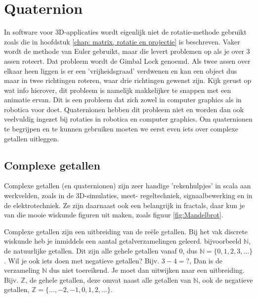 \chapter{Quaternion}
\label{chap: Quaternion}
In software voor 3D-applicaties wordt eigenlijk niet de rotatie-methode gebruikt zoals die in hoofdstuk \ref{chap: matrix, rotatie en projectie} is beschreven. Vaker wordt de methode van Euler gebruikt, maar die levert problemen op als je over 3 assen roteert. Dat probleem wordt de Gimbal Lock genoemd. Als twee assen over elkaar heen liggen is er een 'vrijheidsgraad' verdwenen en kan een object dus maar in twee richtingen roteren, waar drie richtingen gewenst zijn. Kijk gerust op \href{https://www.youtube.com/watch?v=zjMuIxRvygQ}{} wat info hierover, dit probleem is namelijk makkelijker te snappen met een animatie ervan. Dit is een probleem dat zich zowel in computer graphics als in robotica voor doet. Quaternionen hebben dit probleem niet en worden dan ook veelvuldig ingezet bij rotaties in robotica en computer graphics. Om quaternionen te begrijpen en te kunnen gebruiken moeten we eerst even iets over complexe getallen uitleggen.


\section{Complexe getallen}
Complexe getallen (en quaternionen) zijn zeer handige 'rekenhulpjes' in scala aan werkvelden, zoals in de 3D-simulaties, meet- regeltechniek, signaalbewerking en in de elektrotechniek. Ze zijn daarnaast ook een belangrijk in fractals, daar kun je van die mooie wiskunde figuren uit maken, zoals figuur \ref{fig:Mandelbrot}. 

Complexe getallen zijn een uitbreiding van de reële getallen. Bij het vak discrete wiskunde heb je inmiddels een aantal getalverzamelingen geleerd. bijvoorbeeld $\mathbb{N}$, de natuurlijke getallen. Dit zijn alle gehele getallen vanaf $0$, dus $\mathbb{N} = \{0, 1, 2, 3, \dots\}$. Wil je ook iets doen met negatieve getallen? Bijv. $3-4=?$, Dan is de verzameling $\mathbb{N}$ dus niet toereikend. Je moet dan uitwijken naar een uitbreiding. Bijv. $\mathbb{Z}$, de gehele getallen, deze omvat naast alle getallen van $\mathbb{N}$, ook de negatieve getallen, $\mathbb{Z} = \{\dots, -2, -1, 0, 1, 2, \dots \}$. 

